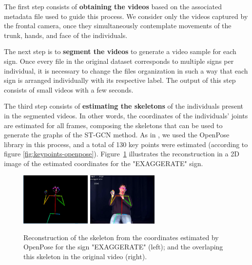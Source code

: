 
The first step consists of \textbf{obtaining the videos} based on the associated metadata file used to guide this process. We consider only the videos captured by the frontal camera, once they simultaneously contemplate movements of the trunk, hands, and face of the individuals.

The next step is to \textbf{segment the videos} to generate a video sample for each sign. Once every file in the original dataset corresponds to multiple signs per individual, it is necessary to change the files organization in such a way that each sign is arranged individually with its respective label. %
The output of this step consists of small videos with a few seconds. %


The third step consists of \textbf{estimating the skeletons} of the individuals present in the segmented videos. In other words, the coordinates of the individuals' joints are estimated for all frames, composing the skeletons that can be used to generate the graphs of the ST-GCN method. As in \cite {st-gcn-2018}, we used the OpenPose library in this process, and a total of 130 key points were estimated (according to figure \ref{fig:keypoints-openpose}). Figure~\ref{fig:sign-pose} illustrates the reconstruction in a 2D image of the estimated coordinates for the "EXAGGERATE" sign.

\begin{figure}[ht]
    \centering
    \includegraphics[width=3.5cm]{images/sign_pose}
    \includegraphics[width=3.5cm]{images/sign_pose_blended}
    \caption{Reconstruction of the skeleton from the coordinates estimated by OpenPose for the sign "EXAGGERATE" (left); and the overlaping this skeleton in the original video (right).}
    \label{fig:sign-pose}
\end{figure}

